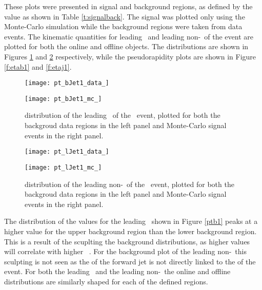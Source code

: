     These plots were presented in signal and background regions, as defined by the \mbb value as shown in Table \ref{t:signalback}. The signal was plotted only using the Monte-Carlo simulation while the background regions were taken from data events. The kinematic quantities for leading \bjet\ and leading non-\bjet\ of the \VBFHBB event are plotted for both the online and offline objects. The \pt distributions are shown in Figures \ref{f:ptb1} and \ref{f:ptj1} respectively, while the pseudorapidity plots are shown in Figure \ref{f:etab1} and \ref{f:etaj1}.

        \begin{figure}[h]
            \centering

            \begin{minipage}[h]{0.48\linewidth}
                \texttt{[image: pt\_bJet1\_data\_]}
            \end{minipage}
            \quad
            \begin{minipage}[h]{0.48\linewidth}
                \texttt{[image: pt\_bJet1\_mc\_]}
            \end{minipage}
            \caption[\pt distribution of the leading \bjet\ of the \VBFHBB\ event]{\pt distribution of the leading \bjet\ of the \VBFHBB\ event, plotted for both the backgroud data regions in the left panel and Monte-Carlo signal events in the right panel.}
            \label{f:ptb1}
        \end{figure}

        \begin{figure}[h]
            \centering

            \begin{minipage}[h]{0.48\linewidth}
                \texttt{[image: pt\_lJet1\_data\_]}
            \end{minipage}
            \quad
            \begin{minipage}[h]{0.48\linewidth}
                \texttt{[image: pt\_lJet1\_mc\_]}
            \end{minipage}
            \caption[\pt distribution of the leading non-\bjet\ of the \VBFHBB\ event]{\pt distribution of the leading non-\bjet\ of the \VBFHBB\ event, plotted for both the backgroud data regions in the left panel and Monte-Carlo signal events in the right panel.}
            \label{f:ptj1}
        \end{figure}

    The distribution of the \pt values for the leading \bjet\ shown in Figure \ref{ptb1} peaks at a higher value for the upper background region than the lower background region. This is a result of the \mbb scuplting the background distributions, as higher \mbb values will correlate with higher \bjet\ \pt. For the background \pt plot of the leading non-\bjet\, this sculpting is not seen as the \pt of the forward jet is not directly linked to the \mbb of the event. For both the leading \bjet\ and the leading non-\bjet\, the online and offline distributions are similarly shaped for each of the defined \mbb regions.

